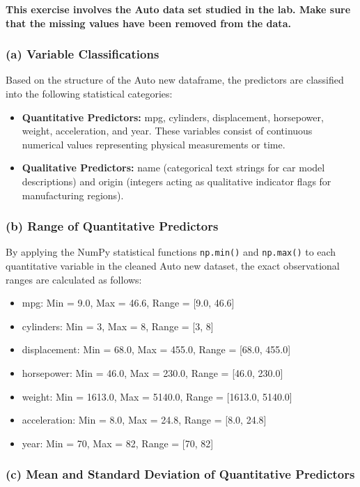 \documentclass[12pt,a4paper]{article}
\begin{document}
\textbf{This exercise involves the Auto data set studied in the lab. Make sure that the missing values have been removed from the data.}

\subsubsection*{(a) Variable Classifications}

Based on the structure of the Auto new dataframe, the predictors are classified into the following statistical categories:

\begin{itemize}
\item \textbf{Quantitative Predictors:} mpg, cylinders, displacement, horsepower, weight, acceleration, and year. These variables consist of continuous numerical values representing physical measurements or time.
\item \textbf{Qualitative Predictors:} name (categorical text strings for car model descriptions) and origin (integers acting as qualitative indicator flags for manufacturing regions).
\end{itemize}

\subsubsection*{(b) Range of Quantitative Predictors}

By applying the NumPy statistical functions \texttt{np.min()} and \texttt{np.max()} to each quantitative variable in the cleaned Auto new dataset, the exact observational ranges are calculated as follows:

\begin{itemize}
\item mpg: Min = 9.0, Max = 46.6, Range = [9.0, 46.6]
\item cylinders: Min = 3, Max = 8, Range = [3, 8]
\item displacement: Min = 68.0, Max = 455.0, Range = [68.0, 455.0]
\item horsepower: Min = 46.0, Max = 230.0, Range = [46.0, 230.0]
\item weight: Min = 1613.0, Max = 5140.0, Range = [1613.0, 5140.0]
\item acceleration: Min = 8.0, Max = 24.8, Range = [8.0, 24.8]
\item year: Min = 70, Max = 82, Range = [70, 82]
\end{itemize}

\subsubsection*{(c) Mean and Standard Deviation of Quantitative Predictors}
\end{document}
